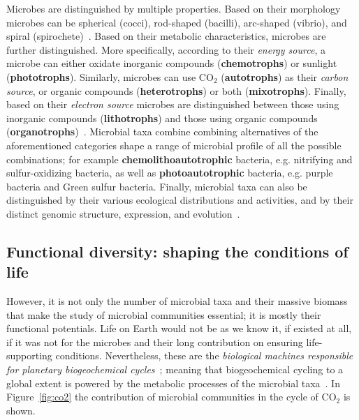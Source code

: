       Microbes are distinguished by multiple properties.
      Based on their morphology microbes can be spherical (cocci), rod-shaped (bacilli),
      arc-shaped (vibrio), and spiral (spirochete)~\cite{dunlap2001microbial}.
      Based on their metabolic characteristics, microbes are further distinguished. 
      More specifically, according to their \textit{energy source}, a microbe
      can either oxidate inorganic compounds (\textbf{chemotrophs}) or sunlight (\textbf{phototrophs}).
      Similarly, microbes can use CO$_2$ (\textbf{autotrophs}) as their \textit{carbon source},
      or organic compounds (\textbf{heterotrophs}) or both (\textbf{mixotrophs}).
      Finally, based on their \textit{electron source} 
      microbes are distinguished between those using inorganic compounds (\textbf{lithotrophs}) and those using organic compounds (\textbf{organotrophs})~\cite{madigan2018brock}.
      Microbial taxa combine combining alternatives of the aforementioned categories 
      shape a range of microbial profile of all the possible combinations; for example      \textbf{chemolithoautotrophic} bacteria, 
      e.g. nitrifying and sulfur-oxidizing bacteria, as well
      as \textbf{photoautotrophic} bacteria, 
      e.g. purple bacteria and Green sulfur bacteria. 
      Finally, microbial taxa can also be distinguished by their various ecological distributions and activities, 
      and by their distinct genomic structure, expression, and evolution~\cite{dunlap2001microbial}. 

   \subsection{Functional diversity: shaping the conditions of life}
   \label{subsec:functional_diversity}
      However, it is not only the number of microbial taxa and their massive biomass that
      make the study of microbial communities essential; 
      it is mostly their functional potentials. 
      Life on Earth would not be as we know it, if existed at all, if it was not for the 
      microbes and their long contribution on ensuring life-supporting conditions. 
      Nevertheless, these are the \textit{biological machines responsible for planetary
      biogeochemical cycles}~\cite{falkowski2008microbial}; meaning that biogeochemical cycling 
      to a global extent
      is powered by the metabolic processes of the microbial taxa~\cite{louca2016decoupling}. 
      In Figure~\ref{fig:co2} the contribution of microbial communities 
      in the cycle of CO$_2$ is shown. 

